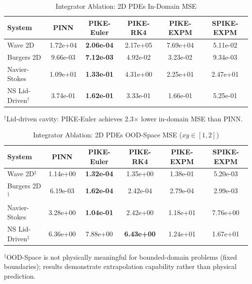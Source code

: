 \documentclass{article}
\theoremstyle{remark}
\begin{document}
\begin{table}[H]
\centering
\caption{Integrator Ablation: 2D PDEs In-Domain MSE}
\label{tab:integrator_2d}
\begin{tabular}{lccccc}
\toprule
System & PINN & PIKE-Euler & PIKE-RK4 & PIKE-EXPM & SPIKE-EXPM \\
\midrule
Wave 2D & 1.72e+04 & \textbf{2.06e-04} & 2.17e+05 & 7.69e+04 & 5.11e-02 \\
Burgers 2D & 9.66e-03 & \textbf{7.12e-03} & 4.92e-02 & 3.23e-02 & 9.34e-03 \\
Navier-Stokes & 1.09e+01 & \textbf{1.33e-01} & 4.31e+00 & 2.25e+01 & 2.47e+01 \\
NS Lid-Driven$^\dagger$ & 3.74e-01 & \textbf{1.62e-01} & 3.33e-01 & 1.66e-01 & 5.25e-01 \\
\bottomrule
\end{tabular}
\vspace{0.5em}
\footnotesize{$^\dagger$Lid-driven cavity: PIKE-Euler achieves 2.3$\times$ lower in-domain MSE than PINN.}
\end{table}

\begin{table}[H]
\centering
\caption{Integrator Ablation: 2D PDEs OOD-Space MSE ($xy \in [1,2]$)}
\label{tab:integrator_2d_ood_space}
\begin{tabular}{lccccc}
\toprule
System & PINN & PIKE-Euler & PIKE-RK4 & PIKE-EXPM & SPIKE-EXPM \\
\midrule
Wave 2D$^\ddagger$ & 1.14e+00 & \textbf{1.32e-04} & 1.35e+00 & 1.38e-01 & 5.20e-03 \\
Burgers 2D$^\ddagger$ & 6.19e-03 & \textbf{1.62e-04} & 2.42e-04 & 2.79e-04 & 2.99e-03 \\
Navier-Stokes & 3.28e+00 & \textbf{1.04e-01} & 2.42e+00 & 1.18e+01 & 7.76e+00 \\
NS Lid-Driven$^\ddagger$ & 6.36e+00 & 7.88e+00 & \textbf{6.43e+00} & 1.24e+01 & 1.67e+01 \\
\bottomrule
\end{tabular}
\vspace{0.5em}
\footnotesize{$^\ddagger$OOD-Space is not physically meaningful for bounded-domain problems (fixed boundaries); results demonstrate extrapolation capability rather than physical prediction.}
\end{table}
\end{document}

